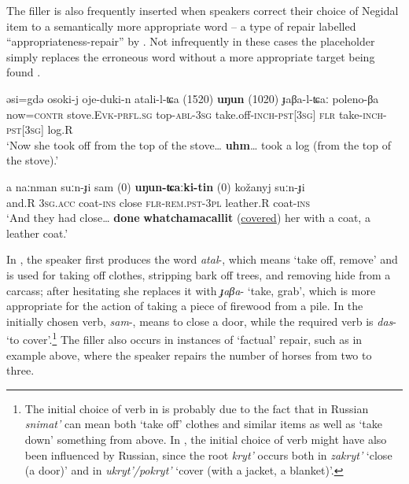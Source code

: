 \documentclass[output=paper]{langscibook}
\begin{document}
The filler is also frequently inserted when speakers correct their choice of Negidal item to a semantically more appropriate word  – a type of repair labelled “appropriateness-repair” by \citet[52]{Levelt1983}. Not infrequently in these cases the placeholder simply replaces the erroneous word without a more appropriate target being found . 


\ea \label{ex:pakendorf:56}
\gll əsi=gdə osoki-j oje-duki-n atali-l-ʨa
	\textup{(1520)} \textbf{uŋun} \textup{(1020)}
	ɟaβa-l-ʨaː poleno-βa\\
     now=\textsc{contr} stove.\textsc{Evk-prfl.sg} top-\textsc{abl-3sg} take.off-\textsc{inch}{}-\textsc{pst[3sg]} {} \textsc{flr} {} take-\textsc{inch-pst[3sg]} log.R\\
\glt ‘Now she took off from the top of the stove… \textbf{uhm}… took a log (from the top of the stove).’ 
\z

\ea \label{ex:pakendorf:57}
\gll a naːnman suːn-ɟi sam
	\textup{(0)} \textbf{uŋun-ʨaːki-tin} \textup{(0)}
	kožanyj suːn-ɟi\\
     and.R \textsc{3sg.acc} coat-\textsc{ins} close
     {} \textsc{flr-rem.pst-3pl} {}
     leather.R coat-\textsc{ins}\\
\glt ‘And they had close… \textbf{done} \textbf{whatchamacallit} (\uline{covered}) her with a coat, a leather coat.’ 
\z

In , the speaker first produces the word \textit{atal}-, which means ‘take off, remove’ and is used for taking off clothes, stripping bark off trees, and removing hide from a carcass; after hesitating she replaces it with \textit{ɟaβa}- ‘take, grab’, which is more appropriate for the action of taking a piece of firewood from a pile. In  the initially chosen verb, \textit{sam}{}-, means to close a door, while the required verb is \textit{das}{}- ‘to cover’.\footnote{The initial choice of verb in  is probably due to the fact that in Russian \textit{snimat’} can mean both ‘take off’ clothes and similar items as well as ‘take down’ something from above. In , the initial choice of verb might have also been influenced by Russian, since the root \textit{kryt’} occurs both in \textit{zakryt’} ‘close (a door)’ and in \textit{ukryt’/pokryt’} ‘cover (with a jacket, a blanket)’.} The filler also occurs in instances of ‘factual’ repair, such as in example  above, where the speaker repairs the number of horses from two to three.
\end{document}

